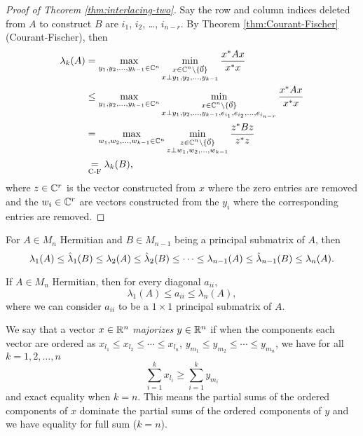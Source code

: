 \begin{proof}[Proof of Theorem \ref{thm:interlacing-two}]
Say the row and column indices deleted from $A$ to construct $B$ are $i_1$, $i_2$, \dots, $i_{n-r}$. By Theorem \ref{thm:Courant-Fischer} (Courant-Fischer), then
\begin{align*}
    \lambda_k(A) 
        &= \max_{y_1, y_2, \dots, y_{k-1} \in \mathbb C^n} \min_{\substack{x \in \mathbb C^n \setminus \{\Vec{0}\} \\ x \perp y_1, y_2, \dots, y_{k-1}}} \frac{x^*Ax}{x^*x} \\
        &\leq \max_{y_1, y_2, \dots, y_{k-1} \in \mathbb C^n} \min_{\substack{x \in \mathbb C^n \setminus \{\Vec{0}\} \\ x \perp y_1, y_2, \dots, y_{k-1}, e_{i_1}, e_{i_2}, \dots, e_{i_{n-r}}}}\frac{x^*Ax}{x^*x} \\
        &= \max_{w_1, w_2, \dots, w_{k-1} \in \mathbb C^n} \min_{\substack{z \in \mathbb C^n \setminus \{\Vec{0}\} \\ z \perp w_1, w_2, \dots, w_{k-1}}} \frac{z^*Bz}{z^*z} \\
        &\underset{\text{C-F}}{=} \lambda_k(B),
\end{align*}
where $z \in \mathbb C^r$ is the vector constructed from $x$ where the zero entries are removed and the $w_i \in \mathbb C^r$ are vectors constructed from the $y_i$ where the corresponding entries are removed.
\end{proof}

\begin{corollary}
\label{cor:interlacing-two-cor1}
For $A \in M_n$ Hermitian and $B \in M_{n-1}$ being a principal submatrix of $A$, then
$$
\lambda_1(A) \leq \Hat{\lambda}_1(B) \leq \lambda_2(A) \leq \Hat{\lambda}_2(B) \leq \dots \leq \lambda_{n-1}(A) \leq \Hat{\lambda}_{n-1}(B) \leq \lambda_n(A).
$$
\end{corollary}

\begin{corollary}
\label{cor:interlacing-two-cor2}
If $A \in M_n$ Hermitian, then for every diagonal $a_{ii}$,
$$
\lambda_1(A) \leq a_{ii} \leq \lambda_n(A),
$$
where we can consider $a_{ii}$ to be a $1 \times 1$ principal submatrix of $A$.
\end{corollary}

\begin{definition}[Majorize]
\label{def:majorize}
We say that a vector $x \in \mathbb R^n$ \textit{majorizes} $y \in \mathbb R^n$ if when the components each vector are ordered as $x_{l_1} \leq x_{l_2} \leq \cdots \leq x_{l_n}$, $y_{m_1} \leq y_{m_2} \leq \cdots \leq y_{m_n}$, we have for all $k = 1, 2, \dots, n$
$$
\sum_{i=1}^k x_{l_i} \geq \sum_{i=1}^k y_{m_i}
$$
and exact equality when $k = n$. This means the partial sums of the ordered components of $x$ dominate the partial sums of the ordered components of $y$ and we have equality for full sum ($k = n$).
\end{definition}

